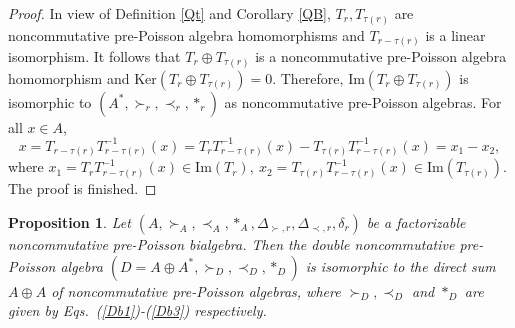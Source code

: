 \documentclass[12pt]{amsart}
\newtheorem{pro}[thm]{Proposition}
\theoremstyle{definition}
\begin{document}
\begin{proof} In view of Definition \ref{Qt} and Corollary \ref{QB}, $T_{r}, T_{\tau(r)}$ are noncommutative pre-Poisson algebra 
homomorphisms and $T_{r-\tau(r)}$ is a linear isomorphism. It follows that
$T_{r}\oplus T_{\tau(r)}$ is a noncommutative pre-Poisson algebra homomorphism and $\mathrm{Ker}(T_{r}\oplus T_{\tau(r)})=0$.
Therefore, $\mathrm{Im}(T_{r}\oplus T_{\tau(r)})$ is isomorphic to $(A^{*},\succ_r,\prec_r,\ast_r)$ as noncommutative pre-Poisson algebras.
For all $x\in A$, 
\begin{equation*}x=T_{r-\tau(r)}T_{r-\tau(r)}^{-1}(x)=T_{r}T_{r-\tau(r)}^{-1}(x)-T_{\tau(r)}T_{r-\tau(r)}^{-1}(x)=x_1-x_2
,\end{equation*}
where $x_1=T_{r}T_{r-\tau(r)}^{-1}(x)\in \mathrm{Im}(T_{r}),~
x_2=T_{\tau(r)}T_{r-\tau(r)}^{-1}(x)\in \mathrm{Im}(T_{\tau(r)})$.
The proof is finished.
\end{proof}

\begin{pro}
 Let $(A, \succ_{A},\prec_{A},\ast_{A}, \Delta_{\succ,r},  \Delta_{\prec,r},\delta_{r})$
 be a factorizable noncommutative pre-Poisson bialgebra. Then the double noncommutative pre-Poisson algebra $(D=A\oplus A^{*},\succ_D,\prec_D,\ast_D)$
is isomorphic to the direct sum $A\oplus A$ of noncommutative pre-Poisson algebras, 
where $\succ_D,\prec_D$ and $\ast_D$ are given by Eqs.~(\ref{Db1})-(\ref{Db3}) respectively.
\end{pro}
\end{document}

